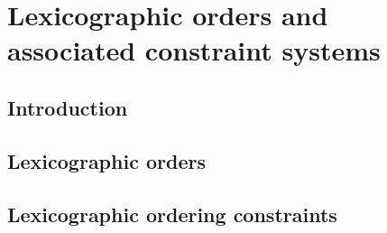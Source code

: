 \section{Lexicographic orders and associated constraint systems}
\subsection{Introduction}                             
\subsection{Lexicographic orders}                     
\subsection{Lexicographic ordering constraints}       
